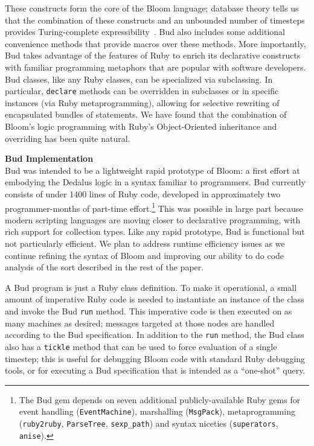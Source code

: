 These constructs form the core of the Bloom language; database theory tells us that the combination of these constructs and an unbounded number of timesteps provides Turing-complete expressibility~\cite{christospaper}.  Bud also includes some additional convenience methods that provide macros over these methods.  More importantly, Bud takes advantage of the features of Ruby to enrich its declarative constructs with familiar programming metaphors that are popular with software developers.  Bud classes, like any Ruby classes, can be specialized via subclassing.  In particular, \texttt{declare} methods can be overridden in subclasses or in specific instances (via Ruby metaprogramming), allowing for selective rewriting of encapsulated bundles of statements.  We have found that the combination of Bloom's logic programming with Ruby's Object-Oriented inheritance and overriding has been quite natural.

\textbf{Bud Implementation}\\
Bud was intended to be a lightweight rapid prototype of Bloom: a first effort at embodying the Dedalus logic in a syntax familiar to programmers.  Bud currently consists of under 1400 lines of Ruby code, developed in approximately two programmer-months of part-time effort.\footnote{The Bud gem depends on seven additional publicly-available Ruby gems for event handling (\texttt{EventMachine}), marshalling (\texttt{MsgPack}), metaprogramming (\texttt{ruby2ruby}, \texttt{ParseTree}, \texttt{sexp\_path}) and syntax niceties (\texttt{superators}, \texttt{anise}).}  This was possible in large part because modern scripting languages are moving closer to declarative programming, with rich support for collection types.  Like any rapid prototype, Bud is functional but not particularly efficient.  We plan to address runtime efficiency issues as we continue refining the syntax of Bloom and improving our ability to do code analysis of the sort described in the rest of the paper.

A Bud program is just a Ruby class definition.  To make it operational, a small amount of imperative Ruby code is needed to instantiate an instance of the class and invoke the Bud \texttt{run} method.  This imperative code is then executed on as many machines as desired; messages targeted at those nodes are handled according to the Bud specification.  In addition to the \texttt{run} method, the Bud class also has a \texttt{tickle} method that can be used to force evaluation of a single timestep; this is useful for debugging Bloom code with standard Ruby debugging tools, or for executing a Bud specification that is intended as a ``one-shot'' query.

